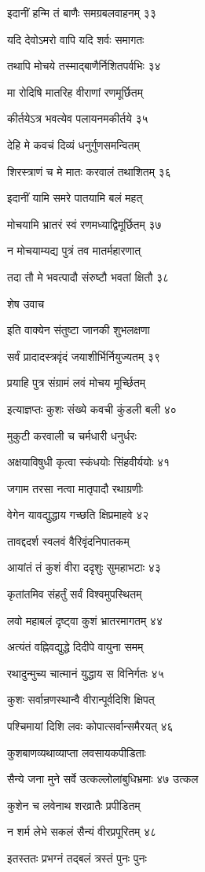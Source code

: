 इदानीं हन्मि तं बाणैः समग्रबलवाहनम् ३३

यदि देवोऽमरो वापि यदि शर्वः समागतः

तथापि मोचये तस्माद्बाणैर्निशितपर्वभिः ३४

मा रोदिषि मातरिह वीराणां रणमूर्छितम्

कीर्तयेऽत्र भवत्येव पलायनमकीर्तये ३५

देहि मे कवचं दिव्यं धनुर्गुणसमन्वितम्

शिरस्त्राणं च मे मातः करवालं तथाशितम् ३६

इदानीं यामि समरे पातयामि बलं महत्

मोचयामि भ्रातरं स्वं रणमध्याद्विमूर्छितम् ३७

न मोचयाम्यद्य पुत्रं तव मातर्महारणात्

तदा तौ मे भवत्पादौ संरुष्टौ भवतां क्षितौ ३८

शेष उवाच

इति वाक्येन संतुष्टा जानकी शुभलक्षणा

सर्वं प्रादादस्त्रवृंदं जयाशीर्भिर्नियुज्यतम् ३९

प्रयाहि पुत्र संग्रामं लवं मोचय मूर्च्छितम्

इत्याज्ञप्तः कुशः संख्ये कवची कुंडली बली ४०

मुकुटी करवाली च चर्मधारी धनुर्धरः

अक्षयाविषुधी कृत्वा स्कंधयोः सिंहवीर्ययोः ४१

जगाम तरसा नत्वा मातृपादौ रथाग्रणीः

वेगेन यावद्युद्धाय गच्छति क्षिप्रमाहवे ४२

तावद्ददर्श स्वलवं वैरिवृंदनिपातकम्

आयांतं तं कुशं वीरा ददृशुः सुमहाभटाः ४३

कृतांतमिव संहर्तुं सर्वं विश्वमुपस्थितम्

लवो महाबलं दृष्ट्वा कुशं भ्रातरमागतम् ४४

अत्यंतं वह्निवद्युद्धे दिदीपे वायुना समम्

रथादुन्मुच्य चात्मानं युद्धाय स विनिर्गतः ४५

कुशः सर्वान्रणस्थान्वै वीरान्पूर्वदिशि क्षिपत्

पश्चिमायां दिशि लवः कोपात्सर्वान्समैरयत् ४६

कुशबाणव्यथाव्याप्ता लवसायकपीडिताः

सैन्ये जना मुने सर्वे उत्कल्लोलांबुधिभ्रमाः ४७ उत्कल

कुशेन च लवेनाथ शरव्रातैः प्रपीडितम्

न शर्म लेभे सकलं सैन्यं वीरप्रपूरितम् ४८

इतस्ततः प्रभग्नं तद्बलं त्रस्तं पुनः पुनः

